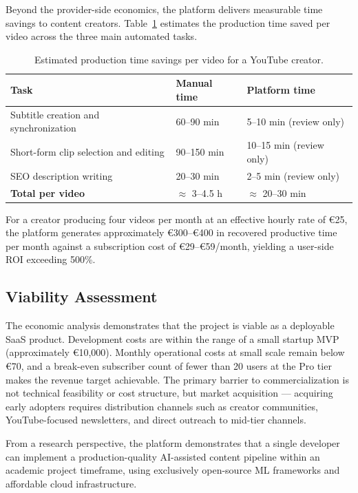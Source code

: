 \documentclass[ENG]{TFUOC}
\begin{document}
Beyond the provider-side economics, the platform delivers measurable time savings to content creators. Table~\ref{tab:creator_value} estimates the production time saved per video across the three main automated tasks.

\begin{table}[H]
\centering
\caption{Estimated production time savings per video for a YouTube creator.}
\label{tab:creator_value}
\begin{tabular}{@{}lll@{}}
\toprule
\textbf{Task} & \textbf{Manual time} & \textbf{Platform time} \\
\midrule
Subtitle creation and synchronization & 60–90 min & 5–10 min (review only) \\
Short-form clip selection and editing & 90–150 min & 10–15 min (review only) \\
SEO description writing               & 20–30 min & 2–5 min (review only)  \\
\midrule
\textbf{Total per video}              & $\approx$ 3–4.5 h & $\approx$ 20–30 min \\
\bottomrule
\end{tabular}
\end{table}

For a creator producing four videos per month at an effective hourly rate of €25, the platform generates approximately €300–€400 in recovered productive time per month against a subscription cost of €29–€59/month, yielding a user-side ROI exceeding 500\%.

\subsection{Viability Assessment}

The economic analysis demonstrates that the project is viable as a deployable SaaS product. Development costs are within the range of a small startup MVP (approximately €10,000). Monthly operational costs at small scale remain below €70, and a break-even subscriber count of fewer than 20 users at the Pro tier makes the revenue target achievable. The primary barrier to commercialization is not technical feasibility or cost structure, but market acquisition — acquiring early adopters requires distribution channels such as creator communities, YouTube-focused newsletters, and direct outreach to mid-tier channels.

From a research perspective, the platform demonstrates that a single developer can implement a production-quality AI-assisted content pipeline within an academic project timeframe, using exclusively open-source ML frameworks and affordable cloud infrastructure.
\end{document}
